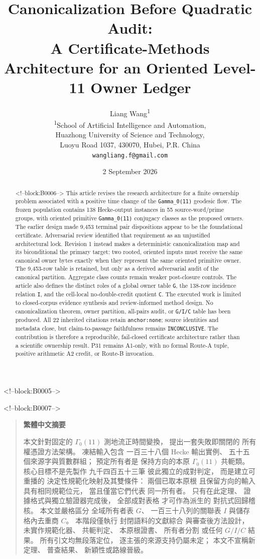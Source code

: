 \documentclass[11pt]{article}
\title{Canonicalization Before Quadratic Audit:\\
A Certificate-Methods Architecture for an Oriented Level-11 Owner Ledger}
\author{Liang Wang\textsuperscript{1}\\
\small \textsuperscript{1}School of Artificial Intelligence and Automation,\\
\small Huazhong University of Science and Technology,\\
\small Luoyu Road 1037, 430070, Hubei, P.R. China\\
\small \texttt{wangliang.f@gmail.com}}
\date{2 September 2026}
\newenvironment{zhabstract}
  {\begin{quotation}\cjkfont\small\raggedright\noindent\textbf{繁體中文摘要}\par\smallskip\mdseries}
  {\end{quotation}}
\begin{document}
\maketitle

<!--block:B0005-->
\begin{abstract}

<!--block:B0006-->
This article revises the research architecture for a finite ownership
problem associated with a positive time change of the
\texttt{Gamma\_0(11)} geodesic flow. The frozen population contains 138
Hecke-output instances in 55 source-word/prime groups, with oriented
primitive \texttt{Gamma\_0(11)} conjugacy classes as the proposed
owners. The earlier design made 9,453 terminal pair dispositions appear
to be the foundational certificate. Adversarial review identified that
requirement as an unjustified architectural lock. Revision 1 instead
makes a deterministic canonicalization map and its biconditional the
primary target: two rooted, oriented inputs must receive the same
canonical owner bytes exactly when they represent the same oriented
primitive owner. The 9,453-row table is retained, but only as a derived
adversarial audit of the canonical partition. Aggregate class counts
remain weaker post-closure controls. The article also defines the
distinct roles of a global owner table \texttt{G}, the 138-row incidence
relation \texttt{I}, and the cell-local no-double-credit quotient
\texttt{C}. The executed work is limited to closed-corpus evidence
synthesis and review-informed method design. No canonicalization
theorem, owner partition, all-pairs audit, or \texttt{G/I/C} table has
been produced. All 22 inherited citations retain \texttt{anchor:none};
source identities and metadata close, but claim-to-passage faithfulness
remains \texttt{INCONCLUSIVE}. The contribution is therefore a
reproducible, fail-closed certificate architecture rather than a
scientific ownership result. P31 remains A1-only, with no formal Route-A
tuple, positive arithmetic A2 credit, or Route-B invocation.
\end{abstract}

<!--block:B0007-->
\begin{zhabstract}
本文針對固定的 $\Gamma_0(11)$ 測地流正時間變換， 提出一套失敗即關閉的 所有權憑證方法架構。 凍結輸入包含 一百三十八個 Hecke 輸出實例、 五十五個來源字與質數群組； 預定所有者是 保持方向的本原 $\Gamma_0(11)$ 共軛類。 核心目標不是先製作 九千四百五十三筆 彼此獨立的成對判定， 而是建立可重播的 決定性規範化映射及其雙條件： 兩個已取本原根 且保留方向的輸入 具有相同規範位元， 當且僅當它們代表 同一所有者。 只有在此定理、 證據格式與獨立驗證器完成後， 全部成對表格 才可作為派生的 對抗式回歸稽核。 本文並嚴格區分 全域所有者表 $G$、 一百三十八列的關聯表 $I$ 與儲存格內去重商 $C$。 本階段僅執行 封閉語料的文獻綜合 與審查後方法設計， 未實作規範化器、 共軛判定、 本原根證書、 所有者分割 或任何 $G/I/C$ 結果。 所有引文均無段落定位， 逐主張的來源支持仍屬未定； 本文不宣稱新定理、 普查結果、 新穎性或路線晉級。
\end{zhabstract}
\end{document}
